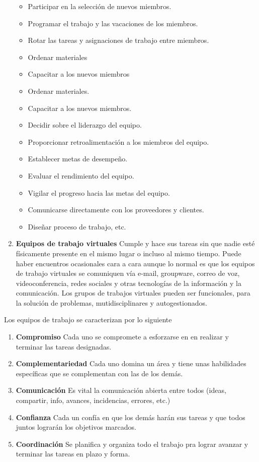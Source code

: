 \begin{enumerate}
    \begin{itemize}
        \item Participar en la selección de nuevos miembros.
        \item Programar el trabajo y las vacaciones de los miembros.
        \item Rotar las tareas y asignaciones de trabajo
        entre miembros.
        \item Ordenar materiales
        \item Capacitar a los nuevos miembros
        \item Ordenar materiales.
        \item Capacitar a los nuevos miembros.
        \item Decidir sobre el liderazgo del equipo.
        \item Proporcionar retroalimentación a los miembros
        del equipo.
        \item Establecer metas de desempeño.
        \item Evaluar el rendimiento del equipo.
        \item Vigilar el progreso hacia las metas del equipo.
        \item Comunicarse directamente con los proveedores y
        clientes.
        \item Diseñar proceso de trabajo, etc.
    \end{itemize}
    
    \item \textbf{Equipos de trabajo virtuales} Cumple y hace sus
    tareas sin que nadie esté físicamente presente en el mismo lugar
    o incluso al mismo tiempo. Puede haber encuentros ocasionales
    cara a cara aunque lo normal es que los equipos de trabajo
    virtuales se comuniquen vía e-mail, groupware, correo de voz,
    videoconferencia, redes sociales y otras tecnologías de la
    información y la comunicación. Los grupos de trabajos virtuales
    pueden ser funcionales, para la solución de problemas,
    mutidisciplinares y autogestionados. 
\end{enumerate}

Los equipos de trabajo se caracterizan por lo siguiente
\begin{enumerate}
    \item \textbf{Compromiso} Cada uno se compromete a esforzarse en
    en realizar y terminar las tareas designadas.
    \item \textbf{Complementariedad} Cada uno domina un área y tiene
    unas habilidades específicas que se complementan con las de los
    demás.
    \item \textbf{Comunicación} Es vital la comunicación abierta
    entre todos (ideas, compartir, info, avances, incidencias, errores,
    etc.)
    \item  \textbf{Confianza} Cada un confía en que los demás harán
    sus tareas y que todos juntos lograrán los objetivos marcados.
    \item \textbf{Coordinación} Se planifica y organiza todo el
    trabajo pra lograr avanzar y terminar las tareas en plazo y forma.
\end{enumerate}

